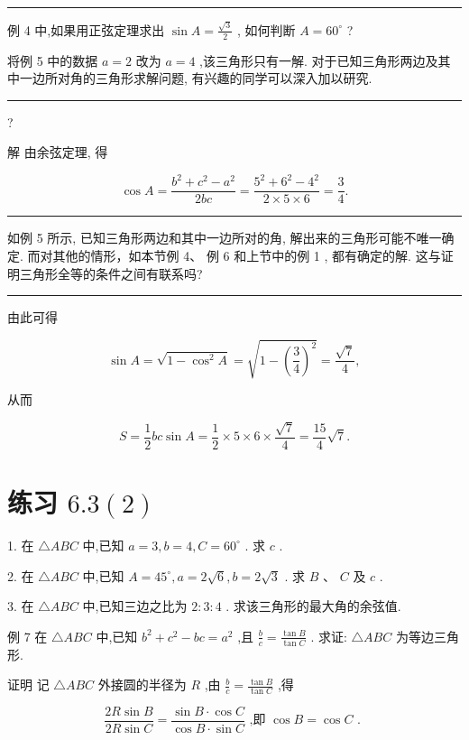 \documentclass[10pt]{article}
\newcommand{\HRule}{\begin{center}\rule{0.9\linewidth}{0.2mm}\end{center}}
\begin{document}
\HRule

例 4 中,如果用正弦定理求出 \(\sin A = \frac{\sqrt{3}}{2}\) , 如何判断 \(A = {60}^{ \circ  }\) ?

将例 5 中的数据 \(a = 2\) 改为 \(a = 4\) ,该三角形只有一解. 对于已知三角形两边及其中一边所对角的三角形求解问题, 有兴趣的同学可以深入加以研究.

\HRule

?

解 由余弦定理, 得

\[
\cos A = \frac{{b}^{2} + {c}^{2} - {a}^{2}}{2bc} = \frac{{5}^{2} + {6}^{2} - {4}^{2}}{2 \times  5 \times  6} = \frac{3}{4}.
\]

\HRule

如例 5 所示, 已知三角形两边和其中一边所对的角, 解出来的三角形可能不唯一确定. 而对其他的情形，如本节例 4、 例 6 和上节中的例 1 , 都有确定的解. 这与证明三角形全等的条件之间有联系吗?

\HRule

由此可得

\[
\sin A = \sqrt{1 - {\cos }^{2}A} = \sqrt{1 - {\left( \frac{3}{4}\right) }^{2}} = \frac{\sqrt{7}}{4},
\]

从而

\[
S = \frac{1}{2}{bc}\sin A = \frac{1}{2} \times  5 \times  6 \times  \frac{\sqrt{7}}{4} = \frac{15}{4}\sqrt{7}.
\]

\section*{练习 \({6.3}\left( 2\right)\)}

1. 在 \(\bigtriangleup {ABC}\) 中,已知 \(a = 3,b = 4,C = {60}^{ \circ  }\) . 求 \(c\) .

2. 在 \(\bigtriangleup {ABC}\) 中,已知 \(A = {45}^{ \circ  },a = 2\sqrt{6},b = 2\sqrt{3}\) . 求 \(B\text{ 、 }C\) 及 \(c\) .

3. 在 \(\bigtriangleup {ABC}\) 中,已知三边之比为 \(2 : 3 : 4\) . 求该三角形的最大角的余弦值.

例 7 在 \(\bigtriangleup {ABC}\) 中,已知 \({b}^{2} + {c}^{2} - {bc} = {a}^{2}\) ,且 \(\frac{b}{c} = \frac{\tan B}{\tan C}\) . 求证: \(\bigtriangleup {ABC}\) 为等边三角形.

证明 记 \(\bigtriangleup {ABC}\) 外接圆的半径为 \(R\) ,由 \(\frac{b}{c} = \frac{\tan B}{\tan C}\) ,得

\[
\frac{{2R}\sin B}{{2R}\sin C} = \frac{\sin B \cdot  \cos C}{\cos B \cdot  \sin C}\text{ ,即 }\cos B = \cos C\text{ . }
\]
\end{document}

